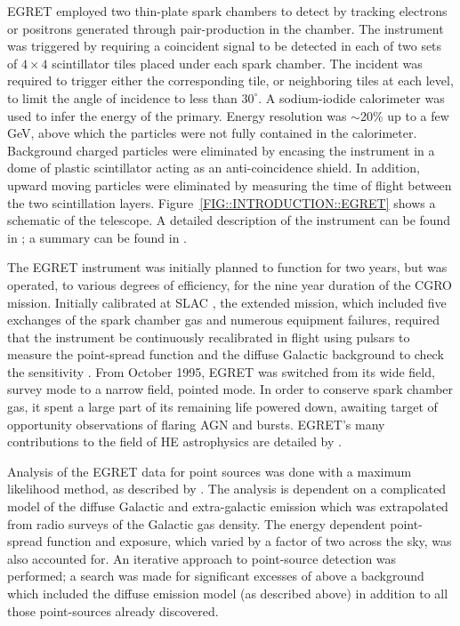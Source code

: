 EGRET employed two thin-plate spark chambers to detect \Grays by
tracking electrons or positrons generated through pair-production in
the chamber. The instrument was triggered by requiring a coincident
signal to be detected in each of two sets of $4\times4$ scintillator
tiles placed under each spark chamber. The incident \Gray was required
to trigger either the corresponding tile, or neighboring tiles at each
level, to limit the angle of incidence to less than $30^\circ$. A
sodium-iodide calorimeter was used to infer the energy of the
primary. Energy resolution was $\sim$20\% up to a few GeV, above which
the particles were not fully contained in the calorimeter. Background
charged particles were eliminated by encasing the instrument in a dome
of plastic scintillator acting as an anti-coincidence shield. In
addition, upward moving particles were eliminated by measuring the
time of flight between the two scintillation layers.
Figure~\ref{FIG::INTRODUCTION::EGRET} shows a schematic of the
telescope. A detailed description of the instrument can be found in
\citet{REF::KANBACH::SSR1988}; a summary can be found in
\citet{REF::ESPOSITO::APJS1999}.

The EGRET instrument was initially planned to function for two years,
but was operated, to various degrees of efficiency, for the nine year
duration of the CGRO mission. Initially calibrated at SLAC
\citep{REF::THOMPSON::APJS1993}, the extended mission, which included
five exchanges of the spark chamber gas and numerous equipment
failures, required that the instrument be continuously recalibrated in
flight using pulsars to measure the point-spread function and the
diffuse Galactic background to check the sensitivity
\citep{REF::ESPOSITO::APJS1999}. From October 1995, EGRET was switched
from its wide field, survey mode to a narrow field, pointed mode. In
order to conserve spark chamber gas, it spent a large part of its
remaining life powered down, awaiting target of opportunity
observations of flaring AGN and \Gray bursts. EGRET's many
contributions to the field of HE \Gray astrophysics are
detailed by \citet{REF::FICHTEL::AAS1996}.

Analysis of the EGRET data for point sources was done with a maximum
likelihood method, as described by \citet{REF::MATTOX::APJ1996}. The
analysis is dependent on a complicated model of the diffuse Galactic
and extra-galactic \Gray emission which was extrapolated from radio
surveys of the Galactic gas density. The energy dependent point-spread
function and exposure, which varied by a factor of two across the sky,
was also accounted for. An iterative approach to point-source
detection was performed; a search was made for significant excesses of
\Grays above a background which included the diffuse \Gray emission
model (as described above) in addition to all those point-sources
already discovered. 

